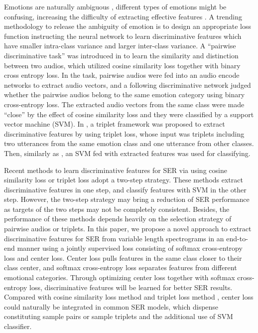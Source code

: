 \documentclass{article}
\begin{document}
Emotions are naturally ambiguous \cite{mower2009interpreting}, different types of emotions might be confusing, increasing the difficulty of extracting effective features \cite{chao2016long}. A trending methodology to release the ambiguity of emotion is to design an appropriate loss function instructing the neural network to learn discriminative features which have smaller intra-class variance and larger inter-class variance. A ``pairwise discriminative task'' was introduced in \cite{lian2018pairwise} to learn the similarity and distinction between two audios, which utilized cosine similarity loss together with binary cross entropy loss. In the task, pairwise audios were fed into an audio encode networks to extract audio vectors, and a following discriminative network judged whether the pairwise audios belong to the same emotion category using binary cross-entropy loss. The extracted audio vectors from the same class were made ``close'' by the effect of cosine similarity loss and they were classified by a support vector machine ({SVM}). In \cite{huang2018speech},  a triplet framework was proposed to extract discriminative features by using triplet loss\cite{schroff2015facenet}, whose input was triplets including two utterances from the same emotion class and one utterance from other classes. Then, similarly as \cite{lian2018pairwise}, an SVM fed with extracted features was used for classifying.

Recent methods to learn discriminative features for SER via using cosine similarity loss\cite{lian2018pairwise} or triplet loss\cite{huang2018speech} adopt a two-step strategy. These methods extract discriminative features in one step, and classify features with SVM in the other step. However, the two-step strategy may bring a reduction of SER performance as targets of the two steps may not be completely consistent. Besides, the performance of these methods depends heavily on the selection strategy of pairwise audios or triplets. In this paper, we propose a novel approach to extract discriminative features for SER from variable length spectrograms in an end-to-end manner using a jointly supervised loss consisting of softmax cross-entropy loss and center loss\cite{wen2016discriminative}. Center loss pulls features in the same class closer to their class center, and softmax cross-entropy loss separates features from different emotional categories. Through optimizing center loss together with softmax cross-entropy loss, discriminative features will be learned for better SER results. Compared with cosine similarity loss method \cite{lian2018pairwise} and triplet loss method \cite{huang2018speech}, center loss could naturally be integrated in common SER models, which dispense constituting sample pairs or sample triplets and the additional use of SVM classifier.
\end{document}

